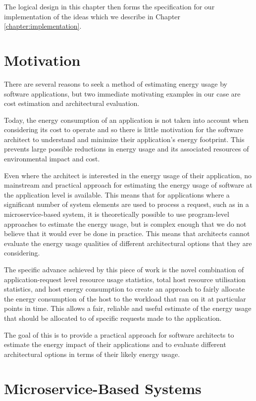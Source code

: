 The logical design in this chapter then forms the specification for our implementation of the ideas which we describe in Chapter \ref{chapter:implementation}.

\section{Motivation}

There are several reasons to seek a method of estimating energy usage by software applications, but two immediate motivating examples in our case are cost estimation and architectural evaluation.

Today, the energy consumption of an application is not taken into account when considering its cost to operate and so there is little motivation for the software architect to understand and minimize their application's energy footprint.  This prevents large possible reductions in energy usage and its associated resources of environmental impact and cost.

Even where the architect is interested in the energy usage of their application, no mainstream and practical approach for estimating the energy usage of software at the application level is available.  This means that for applications where a significant number of system elements are used to process a request, such as in a microservice-based system, it is theoretically possible to use program-level approaches to estimate the energy usage, but is complex enough that we do not believe that it would ever be done in practice.  This means that architects cannot evaluate the energy usage qualities of different architectural options that they are considering.

The specific advance achieved by this piece of work is the novel combination of application-request level resource usage statistics, total host resource utilisation statistics, and host energy consumption to create an approach to fairly allocate the energy consumption of the host to the workload that ran on it at particular points in time.  This allows a fair, reliable and useful estimate of the energy usage that should be allocated to of specific requests made to the application.

The goal of this is to provide a practical approach for software architects to estimate the energy impact of their applications and to evaluate different architectural options in terms of their likely energy usage.

\section{Microservice-Based Systems}

